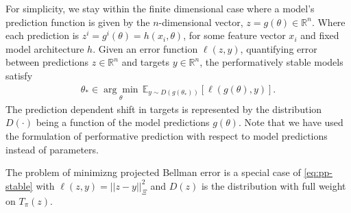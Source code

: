 \documentclass{article} %
\theoremstyle{definition}
\newcommand{\reals}{\mathbb{R}}
\newcommand{\expect}[2][]{\mathbb{E}_{#1}\left[ #2\right]}
\begin{document}
For simplicity, we stay within the finite dimensional case where a model's prediction function is given by the $n$-dimensional vector, $z = g(\theta) \in \reals^n$.
Where each prediction is $z^i = g^i(\theta) = h(x_i, \theta)$, for some feature vector $x_i$ and fixed model architecture $h$.
Given an error function $\ell(z,y)$, quantifying error between predictions $z \in \reals^n$ and targets $y \in \reals^n$, the performatively stable models satisfy
\begin{align}\label{eq:pp-stable}
    \theta_\ast \in \underset{\theta}{\arg \min} \, \expect[y\sim D(g(\theta_\ast))]{\ell(g(\theta),y)}. 
\end{align}
The prediction dependent shift in targets is represented by the distribution $D(\cdot)$ being a function of the model predictions $g(\theta)$.
Note that we have used the formulation of performative prediction with respect to model predictions~\citep{mofakhami2023performative} instead of parameters.

The problem of minimizng projected Bellman error is a special case of \eqref{eq:pp-stable} with $\ell(z,y) = ||z-y||^2_{\Xi}$ and $D(z)$ is the distribution with full weight on $T_{\pi}(z)$. 
\end{document}
